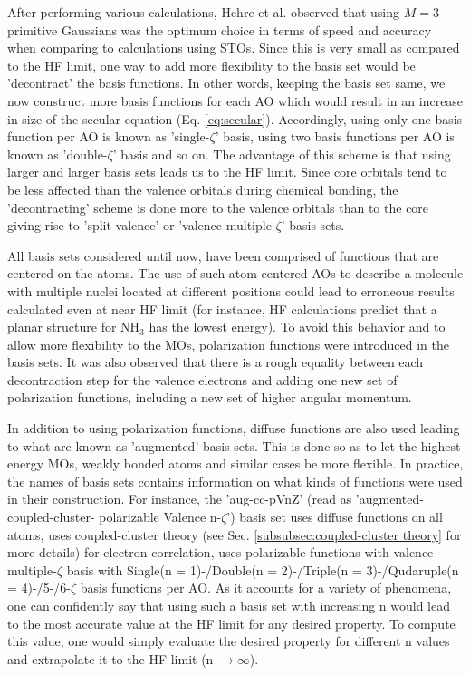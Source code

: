            After performing various calculations, Hehre et al. \cite{Hehre1969} observed that using $M = 3$ primitive Gaussians was the optimum choice in terms of speed and accuracy when comparing to calculations using STOs. Since this is very small as compared to the HF limit, one way to add more flexibility to the basis set would be 'decontract' the basis functions. In other words, keeping the basis set same, we now construct more basis functions for each AO which would result in an increase in size of the secular equation (Eq. \eqref{eq:secular}). Accordingly, using only one basis function per AO is known as 'single-$\zeta$' basis, using two basis functions per AO is known as 'double-$\zeta$' basis and so on. The advantage of this scheme is that using larger and larger basis sets leads us to the HF limit. Since core orbitals tend to be less affected than the valence orbitals during chemical bonding, the 'decontracting' scheme is done more to the valence orbitals than to the core giving rise to 'split-valence' or 'valence-multiple-$\zeta$' basis sets.

            All basis sets considered until now, have been comprised of functions that are centered on the atoms. The use of such atom centered AOs to describe a molecule with multiple nuclei located at different positions could lead to erroneous results calculated even at near HF limit (for instance, HF calculations predict that a planar structure for NH$_3$ has the lowest energy). To avoid this behavior and to allow more flexibility to the MOs, polarization functions were introduced in the basis sets. It was also observed that there is a rough equality between each decontraction step for the valence electrons and adding one new set of polarization functions, including a new set of higher angular momentum.

            In addition to using polarization functions, diffuse functions are also used leading to what are known as 'augmented' basis sets. This is done so as to let the highest energy MOs, weakly bonded atoms and similar cases be more flexible. In practice, the names of basis sets contains information on what kinds of functions were used in their construction. For instance, the 'aug-cc-pVnZ' (read as 'augmented-coupled-cluster- polarizable Valence n-$\zeta$') basis set uses diffuse functions on all atoms, uses coupled-cluster theory (see Sec. \ref{subsubsec:coupled-cluster theory} for more details) for electron correlation, uses polarizable functions with valence-multiple-$\zeta$ basis with Single(n = 1)-/Double(n = 2)-/Triple(n = 3)-/Qudaruple(n = 4)-/5-/6-$\zeta$ basis functions per AO. As it accounts for a variety of phenomena, one can confidently say that using such a basis set with increasing n would lead to the most accurate value at the HF limit for any desired property. To compute this value, one would simply evaluate the desired property for different n values and extrapolate it to the HF limit (n $\to \infty$).

